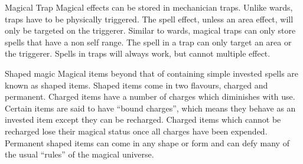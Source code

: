 \begin{multicols*}{3}
\begin{Description}
\item[Magical Trap] Magical effects can be stored in mechanician
traps.  Unlike wards, traps have to be physically triggered.  The
spell effect, unless an area effect, will only be targeted on the
triggerer.  Similar to wards, magical traps can only store spells that
have a non self range.  The spell in a trap can only target an area or
the triggerer.  Spells in traps will always work, but cannot multiple
effect.

\item[Shaped magic] Magical items beyond that of containing simple
invested spells are known as shaped items.  Shaped items come in two
flavours, charged and permanent.  Charged items have a number of
charges which diminishes with use.  Certain items are said to have
``bound charges'', which means they behave as an invested item except
they can be recharged.  Charged items which cannot be recharged lose
their magical status once all charges have been expended.  Permanent
shaped items can come in any shape or form and can defy many of the
usual ``rules'' of the magical universe.

\end{Description}

\end{multicols*}
